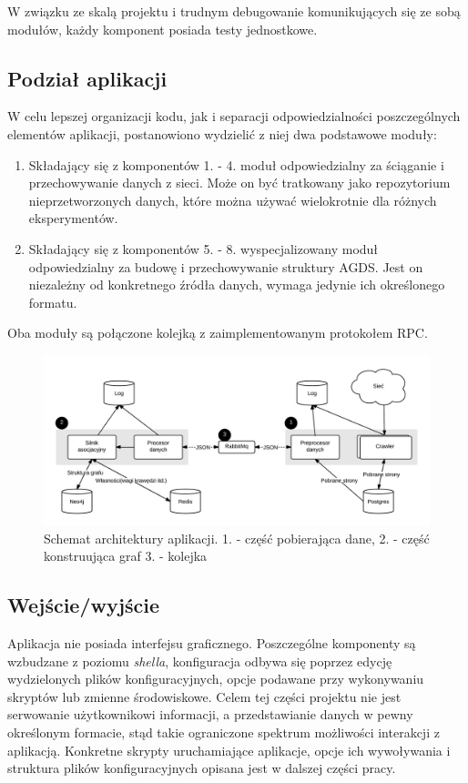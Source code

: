 W związku ze skalą projektu i trudnym debugowanie komunikujących się ze sobą modułów, każdy komponent posiada testy jednostkowe.

\subsection{Podział aplikacji}

W celu lepszej organizacji kodu, jak i separacji odpowiedzialności poszczególnych elementów aplikacji, postanowiono wydzielić z niej dwa podstawowe moduły:
\begin{enumerate}
\item Składający się z komponentów 1. - 4. moduł odpowiedzialny za ściąganie i przechowywanie danych z sieci. Może on być tratkowany jako repozytorium
nieprzetworzonych danych, które można używać wielokrotnie dla różnych eksperymentów.
\item Składający się z komponentów 5. - 8. wyspecjalizowany moduł odpowiedzialny za budowę i przechowywanie struktury AGDS. Jest on niezależny od konkretnego źródła
danych, wymaga jedynie ich określonego formatu.
\end{enumerate}

Oba moduły są połączone kolejką z zaimplementowanym protokołem RPC.

\begin{figure}[!h]
    \centering
    \label{graph:aplikacja}
    \includegraphics[scale=0.2]{aplikacja}
    \caption{Schemat architektury aplikacji. 1. - część pobierająca dane, 2. - część konstruująca graf 3. - kolejka}
\end{figure}

\subsection{Wejście/wyjście}
\label{subsec:weWy}

Aplikacja nie posiada interfejsu graficznego. Poszczególne komponenty są wzbudzane z poziomu \emph{shella}, konfiguracja odbywa się poprzez edycję wydzielonych plików konfiguracyjnych, 
opcje podawane przy wykonywaniu skryptów lub zmienne środowiskowe. Celem tej części projektu nie jest serwowanie użytkownikowi informacji, a przedstawianie danych w pewny określonym
formacie, stąd takie ograniczone spektrum możliwości interakcji z aplikacją. Konkretne skrypty uruchamiające aplikacje, opcje ich wywoływania i struktura plików konfiguracyjnych opisana 
jest w dalszej części pracy.

